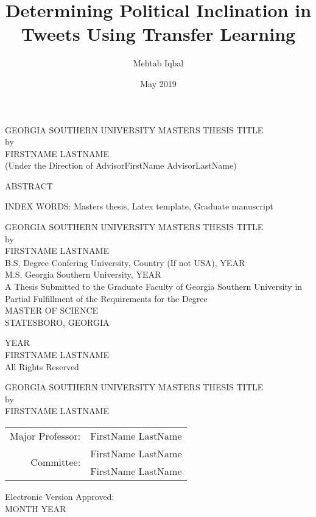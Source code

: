\documentclass[11pt]{report}
\title{Determining Political Inclination in Tweets Using Transfer Learning}
\author{Mehtab Iqbal}
\date{May 2019}
\begin{document}
\begin{titlepage}
\begin{center}
\uppercase{Georgia Southern University Masters Thesis Title} \\
\bigskip
by \\
\bigskip
\uppercase{FirstName LastName} \\
\bigskip
(Under the Direction of AdvisorFirstName AdvisorLastName)
\bigskip
\end{center}
\begin{center}
\uppercase{Abstract}
\end{center}
\lipsum[2-2]

\bigskip
\noindent
\uppercase{Index Words}: Masters thesis, Latex template, Graduate manuscript
\end{titlepage}

\newpage
\begin{center}
\uppercase{Georgia Southern University Masters Thesis Title} \\
\bigskip
by \\
\bigskip
\uppercase{FirstName LastName} \\
\bigskip
B.S, Degree Confering University, Country (If not USA), YEAR \\
M.S, Georgia Southern University, YEAR \\
\bigskip
A Thesis Submitted to the Graduate Faculty of Georgia Southern University in Partial Fulfillment of the Requirements for the Degree \\
\bigskip
\uppercase{MASTER OF SCIENCE} \\
\bigskip
\uppercase{STATESBORO, GEORGIA}
\end{center}

\newpage
\null\vfill
\begin{center}
\textcopyright \space YEAR \\
\bigskip
\uppercase{FirstName LastName} \\
\bigskip
All Rights Reserved
\end{center}

\newpage
\begin{center}
\uppercase{Georgia Southern University Masters Thesis Title} \\
\bigskip
by \\
\bigskip
\uppercase{FirstName LastName} \\
\end{center}

\vspace*{\fill}
\begin{center}
\begin{tabular}{rl}
Major Professor: 			   & FirstName LastName \\
\multirow[t]{2}{*}{Committee:} & FirstName LastName \\
							   & FirstName LastName
\end{tabular}
\end{center}
\vspace*{\fill}
\bigskip
Electronic Version Approved: \\
MONTH YEAR
\end{document}
